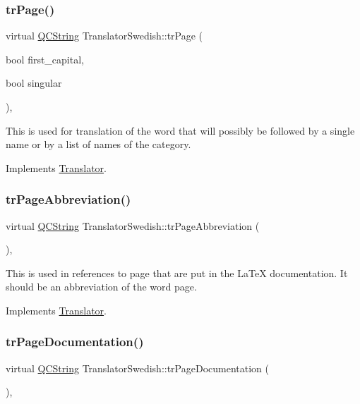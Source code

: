 \subsubsection{\texorpdfstring{trPage()}{trPage()}}
{\footnotesize\ttfamily virtual \mbox{\hyperlink{class_q_c_string}{Q\+C\+String}} Translator\+Swedish\+::tr\+Page (\begin{DoxyParamCaption}\item[{bool}]{first\+\_\+capital,  }\item[{bool}]{singular }\end{DoxyParamCaption})\hspace{0.3cm}{\ttfamily [inline]}, {\ttfamily [virtual]}}

This is used for translation of the word that will possibly be followed by a single name or by a list of names of the category. 

Implements \mbox{\hyperlink{class_translator}{Translator}}.

\mbox{\label{class_translator_swedish_a1bc4d46a7479e5f549059059809616a6}} 
\subsubsection{\texorpdfstring{trPageAbbreviation()}{trPageAbbreviation()}}
{\footnotesize\ttfamily virtual \mbox{\hyperlink{class_q_c_string}{Q\+C\+String}} Translator\+Swedish\+::tr\+Page\+Abbreviation (\begin{DoxyParamCaption}{ }\end{DoxyParamCaption})\hspace{0.3cm}{\ttfamily [inline]}, {\ttfamily [virtual]}}

This is used in references to page that are put in the La\+TeX documentation. It should be an abbreviation of the word page. 

Implements \mbox{\hyperlink{class_translator}{Translator}}.

\mbox{\label{class_translator_swedish_a5755972a39a6f671dbdec259af09e911}} 
\subsubsection{\texorpdfstring{trPageDocumentation()}{trPageDocumentation()}}
{\footnotesize\ttfamily virtual \mbox{\hyperlink{class_q_c_string}{Q\+C\+String}} Translator\+Swedish\+::tr\+Page\+Documentation (\begin{DoxyParamCaption}{ }\end{DoxyParamCaption})\hspace{0.3cm}{\ttfamily [inline]}, {\ttfamily [virtual]}}

